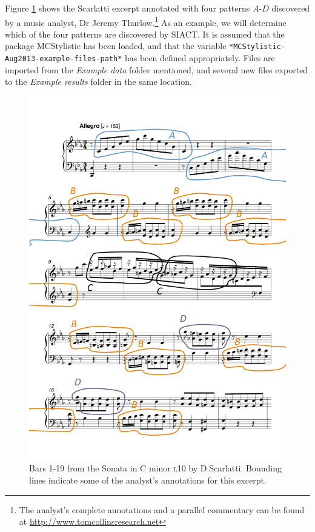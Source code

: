 Figure \ref{scarlatti-L10-ann-all} shows the Scarlatti excerpt annotated with four patterns $A$-$D$ discovered by a music analyst, Dr Jeremy Thurlow.\footnote{The analyst's complete annotations and a parallel commentary can be found at \href{http://www.tomcollinsresearch.net}{http://www.tomcollinsresearch.net}} As an example, we will determine which of the four patterns are discovered by SIACT. It is assumed that the package
MCStylistic has been loaded, and that the variable
\texttt{*MCStylistic-Aug2013-example-files-path*} has been defined appropriately. Files are imported from the
\emph{Example data} folder mentioned, and several new
files exported to the \emph{Example results} folder in the same location.

\begin{figure}[htbp!]
\begin{center}
\includegraphics[width=0.8\columnwidth]{"Example code/figs/scarlatti-L10-ann-all"}
\end{center}
\caption[Bars 1-19 from the Sonata in C minor \textsc{l}10 by D.\hspace{0.1cm}Scarlatti, with annotations]{Bars 1-19 from the Sonata in C minor \textsc{l}10 by D.\hspace{0.1cm}Scarlatti. Bounding lines indicate some of the analyst's annotations for this excerpt.}
\label{scarlatti-L10-ann-all}
\end{figure}

